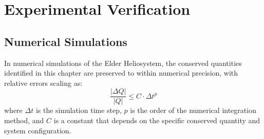\section{Experimental Verification}

\subsection{Numerical Simulations}

\begin{theorem}
In numerical simulations of the Elder Heliosystem, the conserved quantities identified in this chapter are preserved to within numerical precision, with relative errors scaling as:
\begin{equation}
\frac{|\Delta Q|}{|Q|} \leq C \cdot \Delta t^p
\end{equation}
where $\Delta t$ is the simulation time step, $p$ is the order of the numerical integration method, and $C$ is a constant that depends on the specific conserved quantity and system configuration.
\end{theorem}

